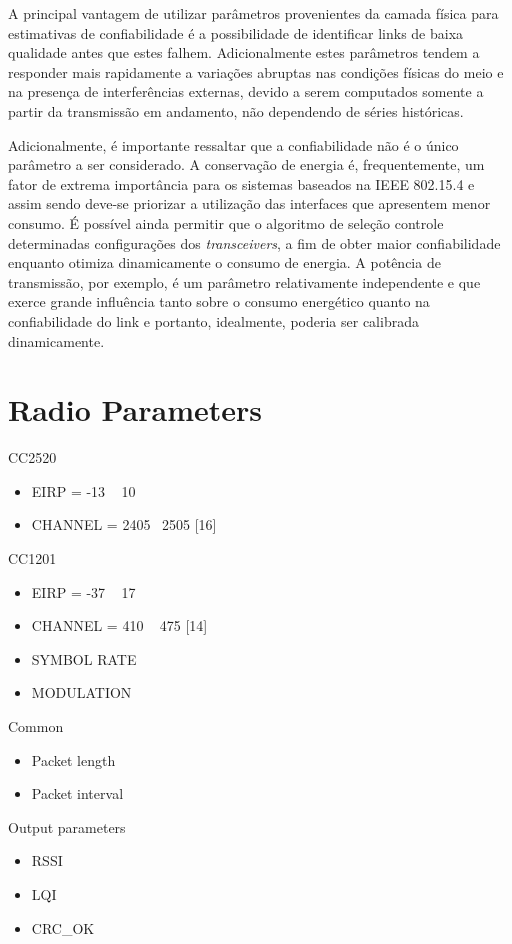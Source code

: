 \documentclass{article}
\begin{document}
	A principal vantagem de utilizar parâmetros provenientes da camada física para estimativas de confiabilidade é a possibilidade de identificar links de baixa qualidade antes que estes falhem. Adicionalmente estes parâmetros tendem a responder mais rapidamente a variações abruptas nas condições físicas do meio e na presença de interferências externas, devido a serem computados somente a partir da transmissão em andamento, não dependendo de séries históricas. 

	Adicionalmente, é importante ressaltar que a confiabilidade não é o único parâmetro a ser considerado. A conservação de energia é, frequentemente, um fator de extrema importância para os sistemas baseados na IEEE 802.15.4 e assim sendo deve-se priorizar a utilização das interfaces que apresentem menor consumo. É possível ainda permitir que o algoritmo de seleção controle determinadas configurações dos \textit{transceivers}, a fim de obter maior confiabilidade enquanto otimiza dinamicamente o consumo de energia. A potência de transmissão, por exemplo, é um parâmetro relativamente independente e que exerce grande influência tanto sobre o consumo energético quanto na confiabilidade do link e portanto, idealmente, poderia ser calibrada dinamicamente.

\clearpage
\section{Radio Parameters}
CC2520
\begin{itemize}
	\item EIRP = -13 ~ 10
	\item CHANNEL = 2405 ~2505 [16]
\end{itemize}
CC1201
\begin{itemize}
	\item EIRP = -37 ~ 17
	\item CHANNEL = 410 ~ 475 [14]
	\item SYMBOL RATE
	\item MODULATION
\end{itemize}
Common
\begin{itemize}
	\item Packet length
	\item Packet interval
\end{itemize}
Output parameters
\begin{itemize}
	\item RSSI
	\item LQI
	\item CRC\_OK
\end{itemize}
\clearpage



\end{document}
